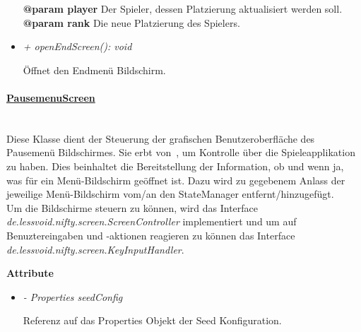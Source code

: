 \begin{itemize}
\begin{leftbar}[0.9\linewidth]
                        \textbf{@param player} Der Spieler, dessen Platzierung aktualisiert werden soll.\\
                        \textbf{@param rank} Die neue Platzierung des Spielers.\\
                    \end{leftbar}
                \item  \textit{+ openEndScreen(): void} 
                    \begin{leftbar}[0.9\linewidth]
                        Öffnet den Endmenü Bildschirm.\\
                    \end{leftbar}
            \end{itemize}

        \paragraph{\underline{PausemenuScreen}} \mbox{}\\
            Diese Klasse dient der Steuerung der grafischen Benutzeroberfläche
            des Pausemenü Bildschirmes. Sie erbt von~, um Kontrolle über die 
            Spieleapplikation zu haben. Dies beinhaltet  die Bereitstellung der
            Information, ob und wenn ja, was für ein Menü-Bildschirm geöffnet ist.
            Dazu wird zu gegebenem Anlass der jeweilige Menü-Bildschirm vom/an den
            StateManager entfernt/hinzugefügt.\\
            Um die Bildschirme steuern zu können, wird das Interface
            \textit{de.lessvoid.nifty.screen.ScreenController} implementiert und um auf
            Benuztereingaben und -aktionen reagieren zu können das Interface
            \textit{de.lessvoid.nifty.screen.KeyInputHandler}. \par
                
            \textbf{Attribute}
            \begin{itemize}
                \item \textit{- Properties seedConfig}  
                    \begin{leftbar}[0.9\linewidth]
                        Referenz auf das Properties Objekt der Seed Konfiguration.
                    \end{leftbar}
            \end{itemize}


